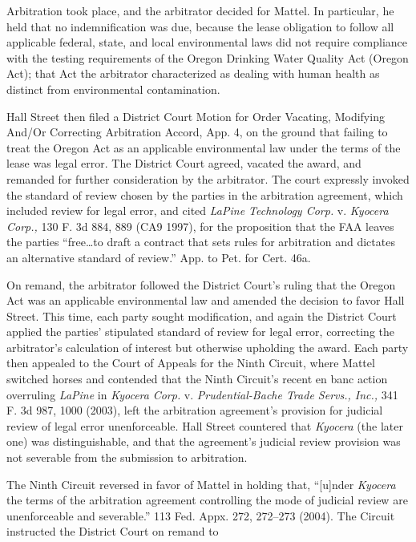 \newpage  Arbitration took place, and the arbitrator decided for Mattel.
In particular, he held that no indemnification was due, because
the lease obligation to follow all applicable federal, state, and
local environmental laws did not require compliance with the testing
requirements of the Oregon Drinking Water Quality Act (Oregon Act);
that Act the arbitrator characterized as dealing with human health as
distinct from environmental contamination.

  Hall Street then filed a District Court Motion for Order Vacating,
Modifying And/Or Correcting Arbitration Accord, App. 4, on
the ground that failing to treat the Oregon Act as an applicable
environmental law under the terms of the lease was legal error. The
District Court agreed, vacated the award, and remanded for further
consideration by the arbitrator. The court expressly invoked the
standard of review chosen by the parties in the arbitration agreement,
which included review for legal error, and cited \emph{LaPine Technology
Corp.} v. \emph{Kyocera Corp.,} 130 F. 3d 884, 889 (CA9 1997), for the
proposition that the FAA leaves the parties ``free\dots to draft a
contract that sets rules for arbitration and dictates an alternative
standard of review.'' App. to Pet. for Cert. 46a.

  On remand, the arbitrator followed the District Court's ruling
that the Oregon Act was an applicable environmental law and amended
the decision to favor Hall Street. This time, each party sought
modification, and again the District Court applied the parties'
stipulated standard of review for legal error, correcting the
arbitrator's calculation of interest but otherwise upholding the
award. Each party then appealed to the Court of Appeals for the Ninth
Circuit, where Mattel switched horses and contended that the Ninth
Circuit's recent en banc action overruling \emph{LaPine} in \emph{Kyocera}
\emph{Corp.} v. \emph{Prudential-Bache Trade Servs., Inc.,} 341 F. 3d 987,
1000 (2003), left the arbitration agreement's provision for
judicial review of legal error unenforceable. Hall Street countered
that \emph{Kyocera} (the later one) was distinguishable, and \newpage  that
the agreement's judicial review provision was not severable from the
submission to arbitration.

  The Ninth Circuit reversed in favor of Mattel in holding that,
``[u]nder \emph{Kyocera} the terms of the arbitration agreement
controlling the mode of judicial review are unenforceable and
severable.'' 113 Fed. Appx. 272, 272--273 (2004). The Circuit
instructed the District Court on remand to

